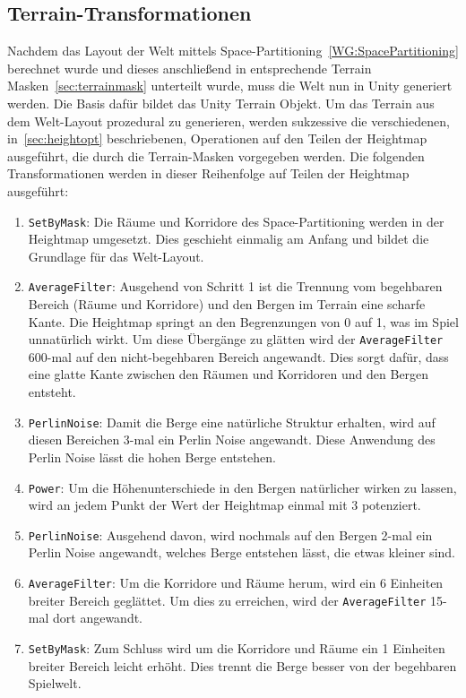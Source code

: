 \subsection{Terrain-Transformationen}
Nachdem das Layout der Welt mittels Space-Partitioning~\ref{WG:SpacePartitioning} berechnet wurde und dieses anschließend in entsprechende Terrain Masken~\ref{sec:terrainmask} unterteilt wurde, muss die Welt nun in Unity generiert werden.
Die Basis dafür bildet das Unity Terrain Objekt.
Um das Terrain aus dem Welt-Layout prozedural zu generieren, werden sukzessive die verschiedenen, in~\ref{sec:heightopt} beschriebenen, Operationen auf den Teilen der Heightmap ausgeführt, die durch die Terrain-Masken vorgegeben werden.
Die folgenden Transformationen werden in dieser Reihenfolge auf Teilen der Heightmap ausgeführt:
\begin{enumerate}
    \item \texttt{SetByMask}: Die Räume und Korridore des Space-Partitioning werden in der Heightmap umgesetzt. Dies geschieht einmalig am Anfang und bildet die Grundlage für das Welt-Layout. %
    \item \texttt{AverageFilter}: Ausgehend von Schritt 1 ist die Trennung vom begehbaren Bereich (Räume und Korridore) und den Bergen im Terrain eine scharfe Kante.
          Die Heightmap springt an den Begrenzungen von 0 auf 1, was im Spiel unnatürlich wirkt.
          Um diese Übergänge zu glätten wird der \texttt{AverageFilter} 600-mal auf den nicht-begehbaren Bereich angewandt.
          Dies sorgt dafür, dass eine glatte Kante zwischen den Räumen und Korridoren und den Bergen entsteht.
    \item \texttt{PerlinNoise}: Damit die Berge eine natürliche Struktur erhalten, wird auf diesen Bereichen 3-mal ein Perlin Noise angewandt.
          Diese Anwendung des Perlin Noise lässt die hohen Berge entstehen.
    \item \texttt{Power}: Um die Höhenunterschiede in den Bergen natürlicher wirken zu lassen, wird an jedem Punkt der Wert der Heightmap einmal mit $3$ potenziert.
    \item \texttt{PerlinNoise}: Ausgehend davon, wird nochmals auf den Bergen 2-mal ein Perlin Noise angewandt, welches Berge entstehen lässt, die etwas kleiner sind.
    \item \texttt{AverageFilter}: Um die Korridore und Räume herum, wird ein 6 Einheiten breiter Bereich geglättet.
          Um dies zu erreichen, wird der \texttt{AverageFilter} 15-mal dort angewandt.
    \item \texttt{SetByMask}: Zum Schluss wird um die Korridore und Räume ein 1 Einheiten breiter Bereich leicht erhöht. Dies trennt die Berge besser von der begehbaren Spielwelt.
\end{enumerate}

